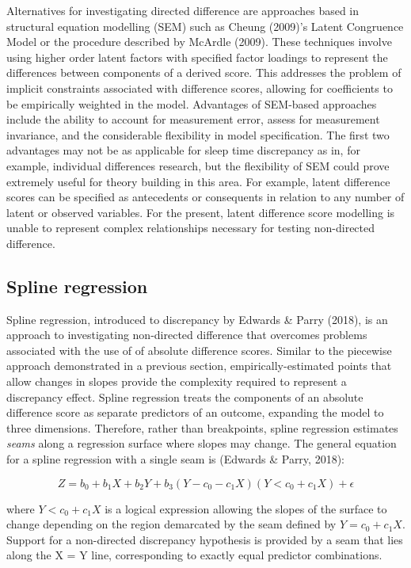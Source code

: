 \documentclass[
]{article}
\begin{document}
Alternatives for investigating directed difference are approaches based in structural equation modelling (SEM) such as Cheung (2009)'s Latent Congruence Model or the procedure described by McArdle (2009). These techniques involve using higher order latent factors with specified factor loadings to represent the differences between components of a derived score. This addresses the problem of implicit constraints associated with difference scores, allowing for coefficients to be empirically weighted in the model. Advantages of SEM-based approaches include the ability to account for measurement error, assess for measurement invariance, and the considerable flexibility in model specification. The first two advantages may not be as applicable for sleep time discrepancy as in, for example, individual differences research, but the flexibility of SEM could prove extremely useful for theory building in this area. For example, latent difference scores can be specified as antecedents or consequents in relation to any number of latent or observed variables. For the present, latent difference score modelling is unable to represent complex relationships necessary for testing non-directed difference.

\subsection{Spline regression}\label{spline-regression}

Spline regression, introduced to discrepancy by Edwards \& Parry (2018), is an approach to investigating non-directed difference that overcomes problems associated with the use of of absolute difference scores. Similar to the piecewise approach demonstrated in a previous section, empirically-estimated points that allow changes in slopes provide the complexity required to represent a discrepancy effect. Spline regression treats the components of an absolute difference score as separate predictors of an outcome, expanding the model to three dimensions. Therefore, rather than breakpoints, spline regression estimates \emph{seams} along a regression surface where slopes may change. The general equation for a spline regression with a single seam is (Edwards \& Parry, 2018):

\begin{equation}
Z = b_{0} + b_{1}X + b_{2}Y + b_{3}(Y - c_{0} - c_{1}X)(Y < c_{0} + c_{1}X) + \epsilon
\label{eq:spline}
\end{equation}

where \(Y < c_{0} + c_{1}X\) is a logical expression allowing the slopes of the surface to change depending on the region demarcated by the seam defined by \(Y = c_{0} + c_{1}X\). Support for a non-directed discrepancy hypothesis is provided by a seam that lies along the X = Y line, corresponding to exactly equal predictor combinations.
\end{document}
